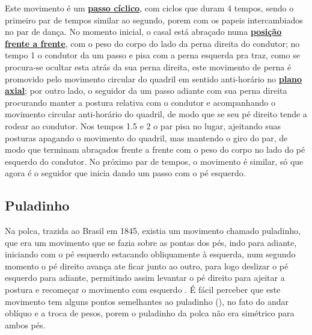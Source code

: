 Este movimento é um \hyperref[def:PassoCiclico]{\textbf{passo cíclico}}, com ciclos que duram 4 tempos, 
sendo o primeiro par de tempos similar ao segundo, porem com os papeis intercambiados no par de dança.
No momento inicial, o casal está abraçado numa \hyperref[def:frente-frente-position]{\textbf{posição frente a frente}}, 
com o peso do corpo do lado da perna direita do condutor;
no tempo 1 o condutor da um passo e pisa com a perna esquerda pra traz, 
como se procura-se ocultar esta atrás da sua perna direita, 
este movimento de perna é promovido pelo movimento circular do 
quadril em sentido anti-horário no \hyperref[def:PlanoAxial]{\textbf{plano axial}};
por outro lado, 
o seguidor da um passo adiante com sua perna direita procurando manter a postura 
relativa com o condutor e acompanhando o movimento circular anti-horário do quadril, 
de modo que se seu pé direito tende a   rodear ao condutor.
Nos tempos 1.5 e 2 o par pisa no lugar, ajeitando suas posturas apagando o movimento do quadril, 
mas mantendo o giro do par, 
de modo que terminam abraçados  frente a frente com o peso do corpo no lado do pé esquerdo do condutor.
No próximo par de tempos, o movimento é similar, só que agora é o seguidor que inicia dando um passo com o pé esquerdo. 

\subsection{Puladinho }

Na polca, trazida ao Brasil em 1845, 
existia um movimento chamado puladinho,
que era um movimento que se fazia sobre as pontas dos pés,
indo para adiante, iniciando com o pé esquerdo estacando obliquamente à esquerda,
num segundo momento o pé direito avança ate ficar junto ao outro, 
para logo deslizar o pé esquerdo para adiante, 
permitindo assim levantar o pé direito para ajeitar a postura 
e recomeçar o movimento com esquerdo \cite[pp. 58-59]{tinhorao1986pequena}.
É fácil perceber que este movimento tem alguns pontos semelhantes ao puladinho (\AnoLivro),
no fato do andar oblíquo e a troca de pesos, porem o puladinho da polca não era simétrico para ambos pés.


